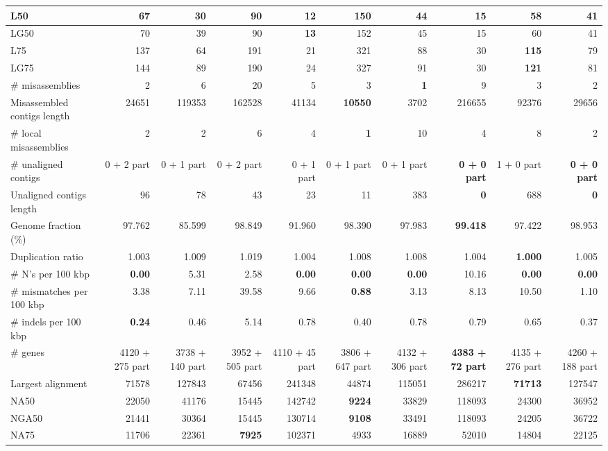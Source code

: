\documentclass[12pt,a4paper]{article}
\begin{document}
\begin{table}[ht]
\begin{center}
\begin{tabular}{|l*{9}{|r}|}
L50 & 67 & 30 & 90 & {\bf 12} & 150 & 44 & 15 & 58 & 41 \\ \hline
LG50 & 70 & 39 & 90 & {\bf 13} & 152 & 45 & 15 & 60 & 41 \\ \hline
L75 & 137 & 64 & 191 & 21 & 321 & 88 & 30 & {\bf 115} & 79 \\ \hline
LG75 & 144 & 89 & 190 & 24 & 327 & 91 & 30 & {\bf 121} & 81 \\ \hline
\# misassemblies & 2 & 6 & 20 & 5 & 3 & {\bf 1} & 9 & 3 & 2 \\ \hline
Misassembled contigs length & 24651 & 119353 & 162528 & 41134 & {\bf 10550} & 3702 & 216655 & 92376 & 29656 \\ \hline
\# local misassemblies & 2 & 2 & 6 & 4 & {\bf 1} & 10 & 4 & 8 & 2 \\ \hline
\# unaligned contigs & 0 + 2 part & 0 + 1 part & 0 + 2 part & 0 + 1 part & 0 + 1 part & 0 + 1 part & {\bf 0 + 0 part} & 1 + 0 part & {\bf 0 + 0 part} \\ \hline
Unaligned contigs length & 96 & 78 & 43 & 23 & 11 & 383 & {\bf 0} & 688 & {\bf 0} \\ \hline
Genome fraction (\%) & 97.762 & 85.599 & 98.849 & 91.960 & 98.390 & 97.983 & {\bf 99.418} & 97.422 & 98.953 \\ \hline
Duplication ratio & 1.003 & 1.009 & 1.019 & 1.004 & 1.008 & 1.008 & 1.004 & {\bf 1.000} & 1.005 \\ \hline
\# N's per 100 kbp & {\bf 0.00} & 5.31 & 2.58 & {\bf 0.00} & {\bf 0.00} & {\bf 0.00} & 10.16 & {\bf 0.00} & {\bf 0.00} \\ \hline
\# mismatches per 100 kbp & 3.38 & 7.11 & 39.58 & 9.66 & {\bf 0.88} & 3.13 & 8.13 & 10.50 & 1.10 \\ \hline
\# indels per 100 kbp & {\bf 0.24} & 0.46 & 5.14 & 0.78 & 0.40 & 0.78 & 0.79 & 0.65 & 0.37 \\ \hline
\# genes & 4120 + 275 part & 3738 + 140 part & 3952 + 505 part & 4110 + 45 part & 3806 + 647 part & 4132 + 306 part & {\bf 4383 + 72 part} & 4135 + 276 part & 4260 + 188 part \\ \hline
Largest alignment & 71578 & 127843 & 67456 & 241348 & 44874 & 115051 & 286217 & {\bf 71713} & 127547 \\ \hline
NA50 & 22050 & 41176 & 15445 & 142742 & {\bf 9224} & 33829 & 118093 & 24300 & 36952 \\ \hline
NGA50 & 21441 & 30364 & 15445 & 130714 & {\bf 9108} & 33491 & 118093 & 24205 & 36722 \\ \hline
NA75 & 11706 & 22361 & {\bf 7925} & 102371 & 4933 & 16889 & 52010 & 14804 & 22125 \\ \hline

\end{tabular}
\end{center}
\end{table}
\end{document}
